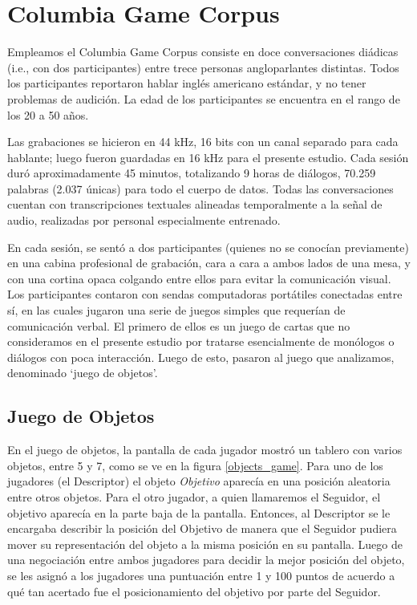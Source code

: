 \section{Columbia Game Corpus}

\newcommand{\objectgame} {\emph{Juego de objetos}}


Empleamos el Columbia Game Corpus  \cite{GRAV2009} consiste en doce conversaciones diádicas (i.e., con dos participantes) entre trece personas angloparlantes distintas. Todos los participantes reportaron hablar inglés americano estándar, y no tener problemas de audición. La edad de los participantes se encuentra en el rango de los 20 a 50 años.

Las grabaciones se hicieron en 44 kHz, 16 bits con un canal separado para cada hablante; luego fueron guardadas en 16 kHz para el presente estudio. Cada sesión duró aproximadamente 45 minutos, totalizando 9 horas de
diálogos, 70.259 palabras (2.037 únicas) para todo el cuerpo de datos. Todas las conversaciones cuentan con transcripciones textuales alineadas temporalmente a la señal de audio, realizadas por personal especialmente entrenado.

En cada sesión, se sentó a dos participantes (quienes no se conocían previamente) en una cabina profesional de grabación, cara a cara a ambos lados de una mesa, y con una cortina opaca colgando entre ellos para evitar la comunicación visual. Los participantes contaron con sendas computadoras portátiles conectadas entre sí, en las cuales jugaron una serie de juegos simples que requerían de comunicación verbal. El primero de ellos es un juego de cartas que no consideramos en el presente estudio por tratarse esencialmente de monólogos o diálogos con poca interacción. Luego de esto, pasaron al juego que analizamos, denominado `juego de objetos'.

\subsection{Juego de Objetos}

En el juego de objetos, la pantalla de cada jugador mostró un tablero con varios objetos, entre 5 y 7, como se ve en la figura \ref{objects_game}.
Para uno de los jugadores (el Descriptor) el objeto \emph{Objetivo} aparecía en una posición aleatoria entre otros objetos. Para el otro jugador, a quien llamaremos el Seguidor, el objetivo aparecía en la parte baja de la pantalla. Entonces, al Descriptor se le encargaba describir la posición del Objetivo de manera que el Seguidor pudiera mover su representación del objeto a la misma posición en su pantalla. Luego de una negociación entre ambos jugadores para decidir la mejor posición del objeto, se les asignó a los jugadores una puntuación entre 1 y 100 puntos de acuerdo a qué tan acertado fue el posicionamiento del objetivo por parte del Seguidor.

